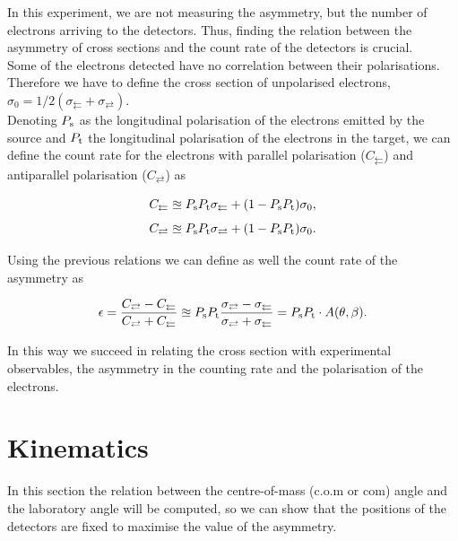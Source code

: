 \documentclass[10pt,swedish, openany]{book}
\begin{document}
In this experiment, we are not measuring the asymmetry, but the number of electrons arriving to the detectors. Thus, finding the relation between the asymmetry of cross sections and the count rate of the detectors is crucial.\\

Some of the electrons detected have no correlation between their polarisations. Therefore we have to define the cross section of unpolarised electrons, $\sigma_0 = 1/2 (\sigma_{\leftleftarrows} + \sigma_{\rightleftarrows})$.\\

Denoting $P_{\rm s}$ as the longitudinal polarisation of the electrons emitted by the source and $P_{\rm t}$ the longitudinal polarisation of the electrons in the target, we can define the count rate for the electrons with parallel polarisation ($C_{\leftleftarrows}$) and antiparallel polarisation ($C_{\rightleftarrows}$) as

\begin{equation}\label{28}
C_{\leftleftarrows} \approxeq P_{\rm s} P_{\rm t} \sigma_{\leftleftarrows} + (1-P_{\rm s} P_{\rm t})\sigma_0,
\end{equation}
\begin{equation}
C_{\rightleftarrows} \approxeq P_{\rm s} P_{\rm t} \sigma_{\rightleftarrows} + (1-P_{\rm s} P_{\rm t})\sigma_0.
\end{equation}

Using the previous relations we can define as well the count rate of the asymmetry as

\begin{equation}\label{30}
\epsilon=\frac{C_{\rightleftarrows}-C_{\leftleftarrows}}{C_{\rightleftarrows}+C_{\leftleftarrows}} \approxeq P_{\rm s} P_{\rm t} \frac{\sigma_{\rightleftarrows}-\sigma_{\leftleftarrows}}{\sigma_{\rightleftarrows}+\sigma_{\leftleftarrows}}= P_{\rm s} P_{\rm t} \cdot A(\theta,\beta).
\end{equation}

In this way we succeed in relating the cross section with experimental observables, the asymmetry in the counting rate and the polarisation of the electrons.

\section{Kinematics}

In this section the relation between the centre-of-mass (c.o.m or com) angle and the laboratory angle will be computed, so we can show that the positions of the detectors are fixed to maximise the value of the asymmetry.\\
\end{document}
